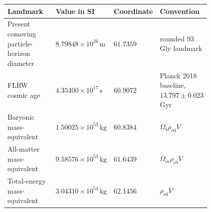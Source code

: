 {\small
\begin{longtable}{L{0.25\linewidth}L{0.20\linewidth}L{0.11\linewidth}L{0.25\linewidth}}
\toprule
Landmark & Value in SI & Coordinate & Convention\\
\midrule
Present comoving particle-horizon diameter & $8.79848\times 10^{26}\,\mathrm{m}$ & $61.7359$ & rounded 93 Gly landmark\\
FLRW cosmic age & $4.35400\times 10^{17}\,\mathrm{s}$ & $60.9072$ & Planck 2018 baseline, $13.797\pm0.023$ Gyr\\
Baryonic mass-equivalent & $1.50025\times 10^{53}\,\mathrm{kg}$ & $60.8384$ & $\Omega_b\rho_{c0}V$\\
All-matter mass-equivalent & $9.58576\times 10^{53}\,\mathrm{kg}$ & $61.6439$ & $\Omega_m\rho_{c0}V$\\
Total-energy mass-equivalent & $3.04310\times 10^{54}\,\mathrm{kg}$ & $62.1456$ & $\rho_{c0}V$\\
\bottomrule
\end{longtable}
}
